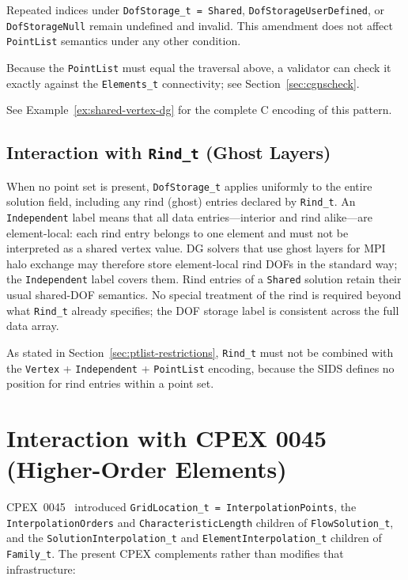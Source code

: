 \documentclass[11pt,letterpaper]{article}
\begin{document}
Repeated indices under \texttt{DofStorage\_t = Shared},
\texttt{DofStorageUserDefined}, or \texttt{DofStorageNull} remain
undefined and invalid.  This amendment does not affect
\texttt{PointList} semantics under any other condition.

Because the \texttt{PointList} must equal the traversal above, a
validator can check it exactly against the \texttt{Elements\_t}
connectivity; see Section~\ref{sec:cgnscheck}.

See Example~\ref{ex:shared-vertex-dg} for the complete C encoding
of this pattern.

\subsection{Interaction with \texttt{Rind\_t} (Ghost Layers)}
\label{sec:rind-interaction}

When no point set is present, \texttt{DofStorage\_t} applies uniformly
to the entire solution field, including any rind (ghost) entries
declared by \texttt{Rind\_t}.  An \texttt{Independent} label means that
all data entries---interior and rind alike---are element-local: each
rind entry belongs to one element and must not be interpreted as a
shared vertex value.  DG solvers that use ghost layers for MPI halo
exchange may therefore store element-local rind DOFs in the standard
way; the \texttt{Independent} label covers them.  Rind
entries of a \texttt{Shared} solution retain their usual
shared-DOF semantics.  No special treatment of the rind is required
beyond what \texttt{Rind\_t} already specifies; the DOF storage label
is consistent across the full data array.

As stated in Section~\ref{sec:ptlist-restrictions}, \texttt{Rind\_t}
must not be combined with the \texttt{Vertex} + \texttt{Independent} +
\texttt{PointList} encoding, because the SIDS defines no position for
rind entries within a point set.

\section{Interaction with CPEX 0045 (Higher-Order Elements)}

CPEX~0045~\cite{cpex0045} introduced
\texttt{GridLocation\_t = InterpolationPoints}, the
\texttt{InterpolationOrders} and \texttt{CharacteristicLength} children
of \texttt{FlowSolution\_t}, and the
\texttt{SolutionInterpolation\_t} and \texttt{ElementInterpolation\_t}
children of \texttt{Family\_t}.  The present CPEX complements rather
than modifies that infrastructure:
\end{document}
